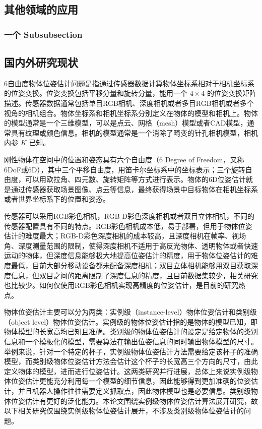 \subsection{其他领域的应用}
\subsubsection{一个 Subsubsection}


\subsection{国内外研究现状}
\par 6自由度物体位姿估计问题是指通过传感器数据计算物体坐标系相对于相机坐标系的位姿变换。位姿变换包括平移分量和旋转分量，能用一个 $4\times 4$ 的位姿变换矩阵描述。传感器数据通常包括单目RGB相机、深度相机或者多目RGB相机或者多个视角的相机组合。物体坐标系和相机坐标系分别定义在物体的模型和相机上。物体的模型通常是一个三维模型，可以是点云、网格（mesh）模型或者CAD模型，通常具有纹理或颜色信息。相机的模型通常是一个消除了畸变的针孔相机模型，相机内参 $K$ 已知。
\par 刚性物体在空间中的位置和姿态具有六个自由度（6 Degree of Freedom，又称6DoF或6D），其中三个平移自由度，用笛卡尔坐标系中的坐标表示；三个旋转自由度，可以用欧拉角、四元数、旋转矩阵等方式进行表示。物体的6D位姿估计就是通过传感器获取场景图像、点云等信息，最终获得场景中目标物体在相机坐标系或者世界坐标系下的位置和姿态。
\par 传感器可以采用RGB彩色相机，RGB-D彩色深度相机或者双目立体相机，不同的传感器配置具有不同的特点。RGB彩色相机成本低，易于部署，但用于物体位姿估计的难度最大；RGB-D彩色深度相机的成本较高，且深度相机在帧率、视场角、深度测量范围的限制，使得深度相机不适用于高反光物体、透明物体或者快速运动的物体，但深度信息能够极大地提高位姿估计的精度，用于物体位姿估计的难度最低，目前大部分移动设备都未配备深度相机；双目立体相机能够用双目获取深度信息，但双目之间的距离限制了深度信息的精度，且目前数据集较少，相关研究也比较少。如何仅使用RGB彩色相机实现高精度的位姿估计，是目前的研究热点。

\par 物体位姿估计主要可以分为两类：实例级（instance-level）物体位姿估计和类别级（object level）物体位姿估计。实例级的物体位姿估计指的是物体的模型已知，即物体模型的长宽高均已知且准确。类别级的物体位姿估计的设定是给定物体的类别信息和一个模板化的模型，需要算法在输出位姿信息的同时输出物体模型的尺寸。举例来说，针对一个特定的杯子，实例级物体位姿估计方法需要给定该杯子的准确模型，而类别级物体位姿估计方法会估计这个杯子的长宽高三个方向的尺寸，由此定义物体的模型，进而进行位姿估计。这两类研究并行进展，总体上来说实例级物体位姿估计更能充分利用每一个模型的细节信息，因此能够得到更加准确的位姿估计，并且机器人操作往往需要定义抓取点，因此物体模型也是必要信息。类别级物体位姿估计有更好的泛化能力。本论文围绕实例级物体位姿估计算法展开研究，故以下相关研究仅围绕实例级物体位姿估计展开，不涉及类别级物体位姿估计的问题。

